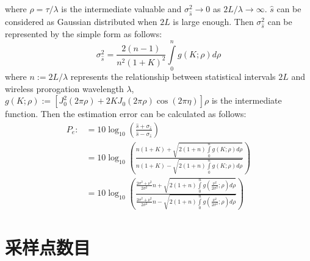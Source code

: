 where $\rho=\tau/\lambda$ is the intermediate valuable and $\sigma_{\hat{s}}^2\rightarrow0$ as $2L/\lambda\rightarrow\infty$. $\hat{s}$ can be considered as Gaussian distributed when $2L$ is large enough. Then $\sigma_{\hat{s}}^2$ can be represented by the simple form as follows:
\begin{equation}
\sigma_{\hat{s}}^2=\frac{2(n-1)}{n^2(1+K)^2}\int\limits_0^n g(K;\rho) d\rho
\label{app:sigmareplace}
\end{equation}
where $n:=2L/\lambda$ represents the relationship between statistical intervals $2L$ and wireless prorogation wavelength $\lambda$, $g(K;\rho):=[J_0^2(2\pi \rho)+2KJ_0(2\pi \rho)\cos(2\pi \eta)]\rho$ is the intermediate function. Then the estimation error can be calculated as follows:
\begin{equation}
\begin{split}
P_e:&=10 \log_{10}\left(\frac{\hat{s}+\sigma_{\hat{s}}}{\hat{s}-\sigma_{\hat{s}}}\right) \\
    &=10 \log_{10}\left(\frac{n(1+K)+\sqrt{2(1+n)\int\limits_0^n g(K;\rho) d\rho}}{n(1+K)-\sqrt{2(1+n)\int\limits_0^n g(K;\rho) d\rho}}\right) \\
    &= 10 \log_{10}\left(\frac{\frac{2\sigma^2+\nu^2}{2\sigma^2}n+\sqrt{2(1+n)\int\limits_0^n g\left(\frac{\nu^2}{2\sigma^2};\rho\right) d\rho}}{\frac{2\sigma^2+\nu^2}{2\sigma^2}n-\sqrt{2(1+n)\int\limits_0^n g\left(\frac{\nu^2}{2\sigma^2};\rho\right) d\rho}}\right)
\end{split}
\label{app:Perror}
\end{equation}


\section{采样点数目}
\label{chap:numberestimation}


